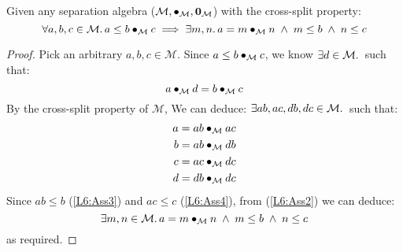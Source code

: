 %
%
\begin{lemma}[]\label{lem:divideUpper}
%
Given any separation algebra ($\mathcal{M}, \bullet_{\mathcal{M}}, \mathbf{0}_{\mathcal{M}}$) with the cross-split property:
\[
	\forall a, b, c \in \mathcal{M}.\, a \leq b \bullet_{\mathcal{M}} c \implies \exists m, n.\, a = m \bullet_{\mathcal{M}} n \;\land\; m \leq b \;\land\; n \leq c
\]
%
\begin{proof}
Pick an arbitrary $a, b, c \in \mathcal{M}$. Since $a \leq b \bullet_{\mathcal{M}} c$, we know $\exists d \in \mathcal{M}.\,$ such that:
%
\begin{equation}
	a \bullet_{\mathcal{M}} d = b \bullet_{\mathcal{M}} c \label{L6:Ass1}
\end{equation}
%
By the cross-split property of $\mathcal{M}$, We can deduce: $\exists ab, ac, db, dc \in \mathcal{M}.\,$ such that:
%
\begin{align}
	a = ab \bullet_{\mathcal{M}} ac \label{L6:Ass2}\\
	b = ab \bullet_{\mathcal{M}} db \label{L6:Ass3}\\
	c = ac \bullet_{\mathcal{M}} dc \label{L6:Ass4}\\
	d = db \bullet_{\mathcal{M}} dc \nonumber 
\end{align}
%
Since $ab \leq b$ (\ref{L6:Ass3}) and $ac \leq c$ (\ref{L6:Ass4}), from (\ref{L6:Ass2}) we can deduce:
%
\begin{equation}
	\exists m, n \in \mathcal{M}.\, a = m \bullet_{\mathcal{M}} n \;\land\; m \leq b \;\land\; n \leq c \nonumber
\end{equation}
%
as required.
\end{proof}
\end{lemma}
%
%
